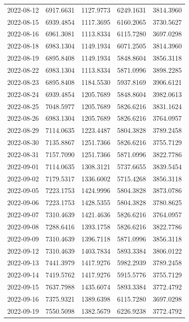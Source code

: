 {\begin{longtable}{lllll}
2022-08-12 & 6917.6631 & 1127.9773 & 6249.1631 & 3814.3960 \\
2022-08-15 & 6939.4854 & 1117.3695 & 6160.2065 & 3730.5627 \\
2022-08-16 & 6961.3081 & 1113.8334 & 6115.7280 & 3697.0298 \\
2022-08-18 & 6983.1304 & 1149.1934 & 6071.2505 & 3814.3960 \\
2022-08-19 & 6895.8408 & 1149.1934 & 5848.8604 & 3856.3118 \\
2022-08-22 & 6983.1304 & 1113.8334 & 5871.0996 & 3898.2285 \\
2022-08-23 & 6895.8408 & 1184.5530 & 5937.8169 & 3906.6121 \\
2022-08-24 & 6939.4854 & 1205.7689 & 5848.8604 & 3982.0613 \\
2022-08-25 & 7048.5977 & 1205.7689 & 5826.6216 & 3831.1624 \\
2022-08-26 & 6983.1304 & 1205.7689 & 5826.6216 & 3764.0957 \\
2022-08-29 & 7114.0635 & 1223.4487 & 5804.3828 & 3789.2458 \\
2022-08-30 & 7135.8867 & 1251.7366 & 5826.6216 & 3755.7129 \\
2022-08-31 & 7157.7090 & 1251.7366 & 5871.0996 & 3822.7786 \\
2022-09-01 & 7114.0635 & 1308.3121 & 5737.6655 & 3839.5454 \\
2022-09-02 & 7179.5317 & 1336.6002 & 5715.4268 & 3856.3118 \\
2022-09-05 & 7223.1753 & 1424.9996 & 5804.3828 & 3873.0786 \\
2022-09-06 & 7223.1753 & 1428.5355 & 5804.3828 & 3780.8625 \\
2022-09-07 & 7310.4639 & 1421.4636 & 5826.6216 & 3764.0957 \\
2022-09-08 & 7288.6416 & 1393.1758 & 5826.6216 & 3822.7786 \\
2022-09-09 & 7310.4639 & 1396.7118 & 5871.0996 & 3856.3118 \\
2022-09-12 & 7310.4639 & 1403.7834 & 5893.3384 & 3806.0122 \\
2022-09-13 & 7441.3979 & 1417.9276 & 5982.2939 & 3789.2458 \\
2022-09-14 & 7419.5762 & 1417.9276 & 5915.5776 & 3755.7129 \\
2022-09-15 & 7637.7988 & 1435.6074 & 5893.3384 & 3772.4792 \\
2022-09-16 & 7375.9321 & 1389.6398 & 6115.7280 & 3697.0298 \\
2022-09-19 & 7550.5098 & 1382.5679 & 6226.9238 & 3772.4792 \\

\end{longtable}}
